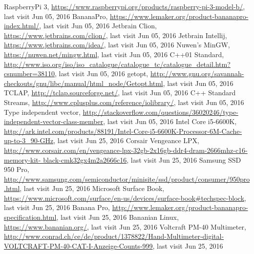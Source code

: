 \begin{thebibliography}{99}
RaspberryPi 3, \url{https://www.raspberrypi.org/products/raspberry-pi-3-model-b/}, last visit Jun 05, 2016
BananaPro, \url{https://www.lemaker.org/product-bananapro-index.html/}, last visit Jun 05, 2016
Jetbrain Clion, \url{https://www.jetbrains.com/clion/}, last visit Jun 05, 2016
 Jetbrain Intellij, \url{https://www.jetbrains.com/idea/}, last visit Jun 05, 2016
Nuwen's MinGW, \url{https://nuwen.net/mingw.html}, last visit Jun 05, 2016
C++01 Standard, \url{http://www.iso.org/iso/iso_catalogue/catalogue_tc/catalogue_detail.htm?csnumber=38110}, last visit Jun 05, 2016
getopt, \url{http://www.gnu.org/savannah-checkouts/gnu/libc/manual/html_node/Getopt.html}, last visit Jun 05, 2016
TCLAP, \url{http://tclap.sourceforge.net/}, last visit Jun 05, 2016
C++ Standard Streams, \url{http://www.cplusplus.com/reference/iolibrary/}, last visit Jun 05, 2016
 Type independent vector, \url{http://stackoverflow.com/questions/36020246/type-independent-vector-class-member}, last visit Jun 05, 2016
 Intel Core i5-6600K, \url{http://ark.intel.com/products/88191/Intel-Core-i5-6600K-Processor-6M-Cache-up-to-3_90-GHz}, last visit Jun 25, 2016
 Corsair Vengeance LPX, \url{http://www.corsair.com/en/vengeance-lpx-32gb-2x16gb-ddr4-dram-2666mhz-c16-memory-kit-
black-cmk32gx4m2a2666c16}, last visit Jun 25, 2016
 Samsung SSD 950 Pro, \url{http://www.samsung.com/semiconductor/minisite/ssd/product/consumer/950pro.html}, last visit Jun 25, 2016
 Microsoft Surface Book, \url{https://www.microsoft.com/surface/en-us/devices/surface-book#techspec-block}, last visit Jun 25, 2016
 Banana Pro, \url{http://www.lemaker.org/product-bananapro-specification.html}, last visit Jun 25, 2016
 Bananian Linux, \url{https://www.bananian.org/}, last visit Jun 25, 2016
 Voltcraft PM-40 Multimeter, \url{http://www.conrad.ch/ce/de/product/1378822/Hand-Multimeter-digital-VOLTCRAFT-PM-40-CAT-I-Anzeige-Counts-999}, last visit Jun 25, 2016
\end{thebibliography}

